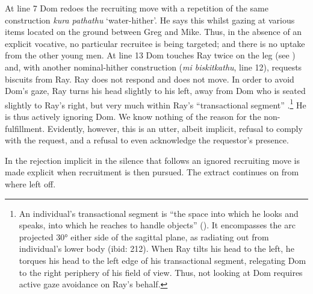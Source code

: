 \documentclass[output=paper,nonflat,colorlinks,citecolor=brown]{langsci/langscibook}
\begin{document}
At line 7 Dom redoes the recruiting move with a repetition of the same construction \textit{kura pathathu} ‘water-hither’. He says this whilst gazing at various items located on the ground between Greg and Mike. Thus, in the absence of an explicit vocative, no particular recruitee is being targeted; and there is no uptake from the other young men. At line 13 Dom touches Ray twice on the leg (see ) and, with another nominal-hither construction (\textit{mi biskitkathu}, line 12), requests biscuits from Ray. Ray does not respond and does not move. In order to avoid Dom’s gaze, Ray turns his head slightly to his left, away from Dom who is seated slightly to Ray’s right, but very much within Ray’s “transactional segment” \citep{Kendon1990}.\footnote{An individual’s transactional segment is “the space into which he looks and speaks, into which he reaches to handle objects” (\citealt[211]{Kendon1990}). It encompasses the arc projected 30° either side of the sagittal plane, as radiating out from individual’s lower body (ibid: 212). When Ray tilts his head to the left, he torques his head to the left edge of his transactional segment, relegating Dom to the right periphery of his field of view. Thus, not looking at Dom requires active gaze avoidance on Ray’s behalf.} He is thus actively ignoring Dom. We know nothing of the reason for the non-fulfillment. Evidently, however, this is an utter, albeit implicit, refusal to comply with the request, and a refusal to even acknowledge the requestor’s presence.

In  the rejection implicit in the silence that follows an ignored recruiting move is made explicit when recruitment is then pursued. The extract continues on from where  left off.
\end{document}
